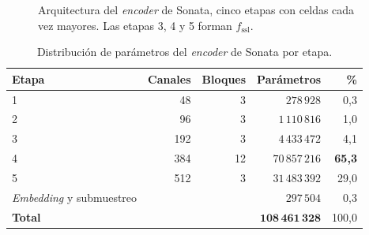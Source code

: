 \begin{figure}[!htbp]
\caption[Arquitectura del \emph{encoder} de Sonata]{Arquitectura del \emph{encoder} de Sonata, cinco etapas con celdas cada vez mayores. Las etapas 3, 4 y 5 forman $f_{\mathrm{ssl}}$.}
\label{fig:arq-sonata}
\end{figure}

\begin{table}[!htbp]
\centering
{}
\caption[Parámetros del \emph{encoder} de Sonata por etapa]{Distribución de parámetros del \emph{encoder} de Sonata por etapa.}
\label{tab:params-sonata}
\begin{tabular}{@{}lrrrr@{}}
\toprule
\textbf{Etapa} & \textbf{Canales} & \textbf{Bloques} & \textbf{Parámetros} & \textbf{\%} \\
\midrule
1 & 48 & 3 & $278\,928$ & 0{,}3 \\
2 & 96 & 3 & $1\,110\,816$ & 1{,}0 \\
3 & 192 & 3 & $4\,433\,472$ & 4{,}1 \\
4 & 384 & 12 & $70\,857\,216$ & \textbf{65{,}3} \\
5 & 512 & 3 & $31\,483\,392$ & 29{,}0 \\
\emph{Embedding} y submuestreo & & & $297\,504$ & 0{,}3 \\
\midrule
\textbf{Total} & & & $\mathbf{108\,461\,328}$ & 100{,}0 \\
\bottomrule
\end{tabular}
\end{table}
\FloatBarrier
